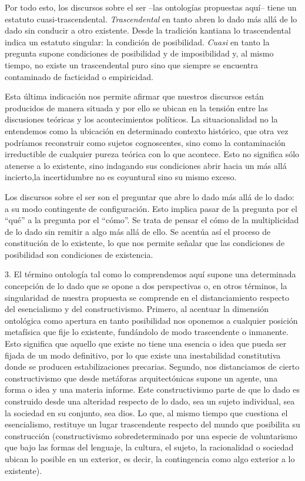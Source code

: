 \documentclass{book}
\begin{document}
Por todo esto, los discursos sobre el ser --las ontologías propuestas
aquí-- tiene un estatuto cuasi-trascendental. \emph{Trascendental} en
tanto abren lo dado más allá de lo dado sin conducir a otro existente.
Desde la tradición kantiana lo trascendental indica un estatuto
singular: la condición de posibilidad. \emph{Cuasi} en tanto la pregunta
supone condiciones de posibilidad y de imposibilidad y, al mismo tiempo,
no existe un trascendental puro sino que siempre se encuentra
contaminado de facticidad o empiricidad.

Esta última indicación nos permite afirmar que nuestros discursos están
producidos de manera situada y por ello se ubican en la tensión entre
las discusiones teóricas y los acontecimientos políticos. La
situacionalidad no la entendemos como la ubicación en determinado
contexto histórico, que otra vez podríamos reconstruir como sujetos
cognoscentes, sino como la contaminación irreductible de cualquier
pureza teórica con lo que acontece. Esto no significa sólo atenerse a lo
existente, sino indagando sus condiciones abrir hacia un más allá
incierto,la incertidumbre no es coyuntural sino su mismo exceso.

Los discursos sobre el ser son el preguntar que abre lo dado más allá de
lo dado: a su modo contingente de configuración. Esto implica pasar de
la pregunta por el \enquote{qué} a la pregunta por el \enquote{cómo}. Se trata de pensar
el cómo de la multiplicidad de lo dado sin remitir a algo más allá de
ello. Se acentúa así el proceso de constitución de lo existente, lo que
nos permite señalar que las condiciones de posibilidad son condiciones
de existencia.

3. El término ontología tal como lo comprendemos aquí supone una
determinada concepción de lo dado que se opone a dos perspectivas o, en
otros términos, la singularidad de nuestra propuesta se comprende en el
distanciamiento respecto del esencialismo y del constructivismo.
Primero, al acentuar la dimensión ontológica como apertura en tanto
posibilidad nos oponemos a cualquier posición metafísica que fije lo
existente, fundándolo de modo trascendente o inmanente. Esto significa
que aquello que existe no tiene una esencia o idea que pueda ser fijada
de un modo definitivo, por lo que existe una inestabilidad constitutiva
donde se producen estabilizaciones precarias. Segundo, nos distanciamos
de cierto constructivismo que desde metáforas arquitectónicas supone un
agente, una forma o idea y una materia informe. Este constructivismo
parte de que lo dado es construido desde una alteridad respecto de lo
dado, sea un sujeto individual, sea la sociedad en su conjunto, sea
dios. Lo que, al mismo tiempo que cuestiona el esencialismo, restituye
un lugar trascendente respecto del mundo que posibilita su construcción
(constructivismo sobredeterminado por una especie de voluntarismo que
bajo las formas del lenguaje, la cultura, el sujeto, la racionalidad o
 sociedad ubican lo posible en un exterior, es decir, la contingencia
como algo exterior a lo existente).
\end{document}
